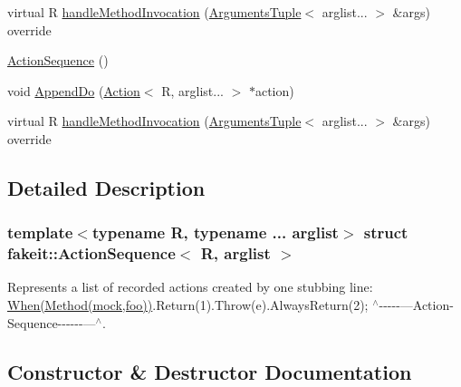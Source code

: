 \begin{DoxyCompactItemize}
\item 
virtual R \mbox{\hyperlink{structfakeit_1_1ActionSequence_a7bc46308e2c35fe407f30045d4ce05a0}{handle\+Method\+Invocation}} (\mbox{\hyperlink{namespacefakeit_a476a37a598825e1b5dd67b3a176491a1}{Arguments\+Tuple}}$<$ arglist... $>$ \&args) override
\item 
\mbox{\hyperlink{structfakeit_1_1ActionSequence_a2c9b1deefcce41af21f9ad4b7b431c7d}{Action\+Sequence}} ()
\item 
void \mbox{\hyperlink{structfakeit_1_1ActionSequence_a1c5ad761d28d11e6886db563e5cb39f6}{Append\+Do}} (\mbox{\hyperlink{structfakeit_1_1Action}{Action}}$<$ R, arglist... $>$ $\ast$action)
\item 
virtual R \mbox{\hyperlink{structfakeit_1_1ActionSequence_a7bc46308e2c35fe407f30045d4ce05a0}{handle\+Method\+Invocation}} (\mbox{\hyperlink{namespacefakeit_a476a37a598825e1b5dd67b3a176491a1}{Arguments\+Tuple}}$<$ arglist... $>$ \&args) override
\end{DoxyCompactItemize}


\subsection{Detailed Description}
\subsubsection*{template$<$typename R, typename ... arglist$>$\newline
struct fakeit\+::\+Action\+Sequence$<$ R, arglist $>$}

Represents a list of recorded actions created by one stubbing line\+: \mbox{\hyperlink{single__header_2tpunit_2fakeit_8hpp_a665d1615d3ae3f21983056f052ab7f24}{When(\+Method(mock,foo))}}.Return(1).Throw(e).Always\+Return(2); $^\wedge$-\/-\/-\/-\/-\/---Action-\/\+Sequence-\/-\/-\/-\/-\/-\/---$^\wedge$. 

\subsection{Constructor \& Destructor Documentation}
\mbox{\label{structfakeit_1_1ActionSequence_a2c9b1deefcce41af21f9ad4b7b431c7d}} 

